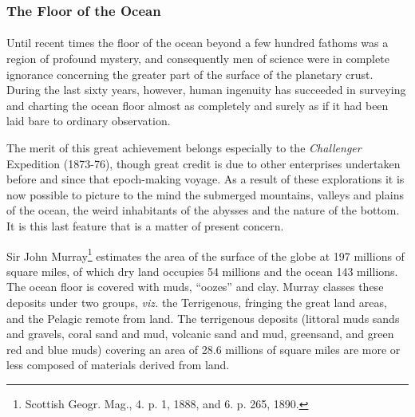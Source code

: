 \documentclass[a4paper, 12pt, oneside, landscape]{article}
\begin{document}
\subsubsection{The Floor of the Ocean}
\paragraph{}
Until recent times the floor of the ocean beyond a few hundred fathoms was a region of profound mystery, and consequently men of science were in complete ignorance concerning the greater part of the surface of the planetary crust. During the last sixty years, however, human ingenuity has succeeded in surveying and charting the ocean floor almost as completely and surely as if it had been laid bare to ordinary observation.

The merit of this great achievement belongs especially to the \emph{Challenger} Expedition (1873-76), though great credit is due to other enterprises undertaken before and since that epoch-making voyage. As a result of these explorations it is now possible to picture to the mind the submerged mountains, valleys and plains of the ocean, the weird inhabitants of the abysses and the nature of the bottom. It is this last feature that is a matter of present concern.

Sir John Murray\footnote{Scottish Geogr. Mag., 4. p. 1, 1888, and 6. p. 265, 1890. } estimates the area of the surface of the globe at 197 millions of square miles, of which dry land occupies 54 millions and the ocean 143 millions. The ocean floor is covered with muds, ``oozes'' and clay. Murray classes these deposits under two groups, \emph{viz.} the Terrigenous, fringing the great land areas, and the Pelagic remote from land. The terrigenous deposits (littoral muds sands and gravels, coral sand and mud, volcanic sand and mud, greensand, and green red and blue muds) covering an area of 28.6 millions of square miles are more or less composed of materials derived from land.
\end{document}
